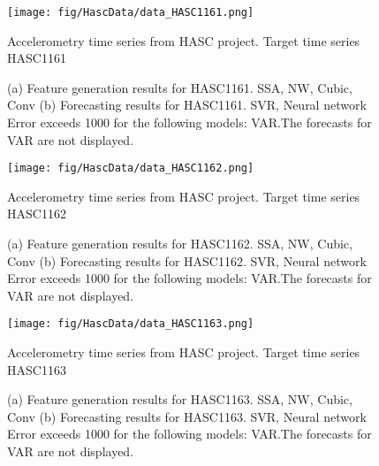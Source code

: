 \documentclass[12pt]{article}
\begin{document}
\begin{figure}
\centering
\texttt{[image: fig/HascData/data\_HASC1161.png]}
\caption{Accelerometry time series from HASC project. Target time series	HASC1161	}
\end{figure}


\begin{figure}
\centering
{}
\caption{(a)	Feature generation results for	HASC1161.	SSA, NW, Cubic, Conv	(b)	Forecasting results for	HASC1161.	SVR, Neural network	Error exceeds 1000 for the following models: VAR.The forecasts for VAR are not displayed.	}
\end{figure}


\begin{figure}
\centering
\texttt{[image: fig/HascData/data\_HASC1162.png]}
\caption{Accelerometry time series from HASC project. Target time series	HASC1162	}
\end{figure}


\begin{figure}
\centering
{}
\caption{(a)	Feature generation results for	HASC1162.	SSA, NW, Cubic, Conv	(b)	Forecasting results for	HASC1162.	SVR, Neural network	Error exceeds 1000 for the following models: VAR.The forecasts for VAR are not displayed.	}
\end{figure}


\begin{figure}
\centering
\texttt{[image: fig/HascData/data\_HASC1163.png]}
\caption{Accelerometry time series from HASC project. Target time series	HASC1163	}
\end{figure}


\begin{figure}
\centering
{}
\caption{(a)	Feature generation results for	HASC1163.	SSA, NW, Cubic, Conv	(b)	Forecasting results for	HASC1163.	SVR, Neural network	Error exceeds 1000 for the following models: VAR.The forecasts for VAR are not displayed.	}
\end{figure}
\end{document}

